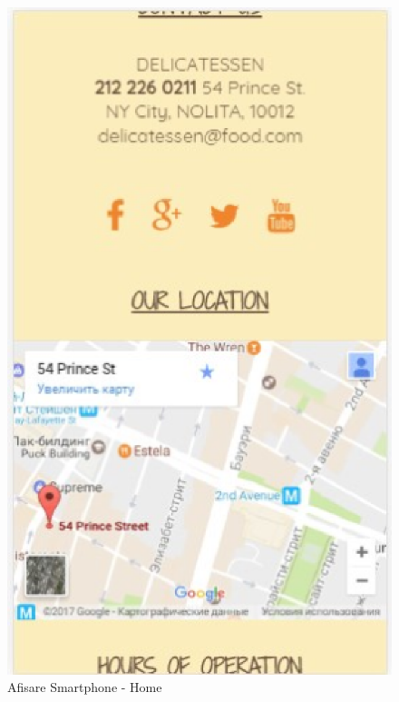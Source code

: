 \documentclass[11pt]{article}
\begin{document}
\begin{figure}[h]
\includegraphics{images/75.eps}
\caption{Afisare Smartphone - Home}
\end{figure}
\end{document}
